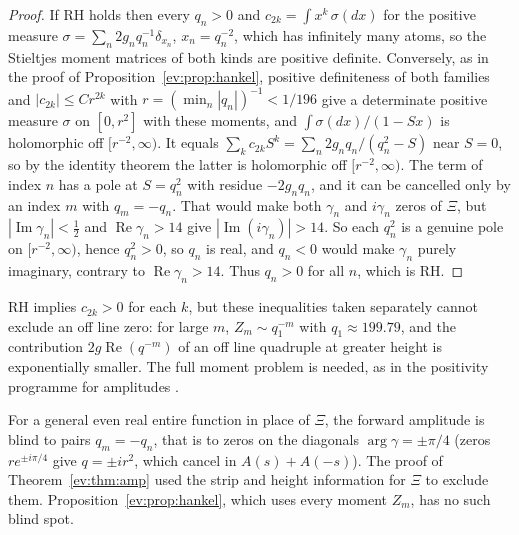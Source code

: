 \begin{proof}
If RH holds then every $q_n>0$ and $c_{2k}=\int x^k\,\sigma(dx)$ for the positive measure $\sigma=\sum_n2g_nq_n^{-1}\delta_{x_n}$, $x_n=q_n^{-2}$, which has infinitely many atoms, so the Stieltjes moment matrices of both kinds are positive definite. Conversely, as in the proof of Proposition~\ref{ev:prop:hankel}, positive definiteness of both families and $|c_{2k}|\le Cr^{2k}$ with $r=(\min_n|q_n|)^{-1}<1/196$ give a determinate positive measure $\sigma$ on $[0,r^2]$ with these moments, and $\int\sigma(dx)/(1-Sx)$ is holomorphic off $[r^{-2},\infty)$. It equals $\sum_kc_{2k}S^k=\sum_n2g_nq_n/(q_n^2-S)$ near $S=0$, so by the identity theorem the latter is holomorphic off $[r^{-2},\infty)$. The term of index $n$ has a pole at $S=q_n^2$ with residue $-2g_nq_n$, and it can be cancelled only by an index $m$ with $q_m=-q_n$. That would make both $\gamma_n$ and $i\gamma_n$ zeros of $\Xi$, but $|\operatorname{Im}\gamma_n|<\tfrac12$ and $\operatorname{Re}\gamma_n>14$ give $|\operatorname{Im}(i\gamma_n)|>14$. So each $q_n^2$ is a genuine pole on $[r^{-2},\infty)$, hence $q_n^2>0$, so $q_n$ is real, and $q_n<0$ would make $\gamma_n$ purely imaginary, contrary to $\operatorname{Re}\gamma_n>14$. Thus $q_n>0$ for all $n$, which is RH.
\end{proof}

\begin{remark}\label{ev:rem:ampheur}
RH implies $c_{2k}>0$ for each $k$, but these inequalities taken separately cannot exclude an off line zero: for large $m$, $Z_m\sim q_1^{-m}$ with $q_1\approx199.79$, and the contribution $2g\operatorname{Re}(q^{-m})$ of an off line quadruple at greater height is exponentially smaller. The full moment problem is needed, as in the positivity programme for amplitudes \cite{AHH21,Bellazzini21}. %
\end{remark}

\begin{remark}\label{ev:rem:ampblind}
For a general even real entire function in place of $\Xi$, the forward amplitude is blind to pairs $q_m=-q_n$, that is to zeros on the diagonals $\arg\gamma=\pm\pi/4$ (zeros $re^{\pm i\pi/4}$ give $q=\pm ir^2$, which cancel in $A(s)+A(-s)$). The proof of Theorem~\ref{ev:thm:amp} used the strip and height information for $\Xi$ to exclude them. Proposition~\ref{ev:prop:hankel}, which uses every moment $Z_m$, has no such blind spot.
\end{remark}

